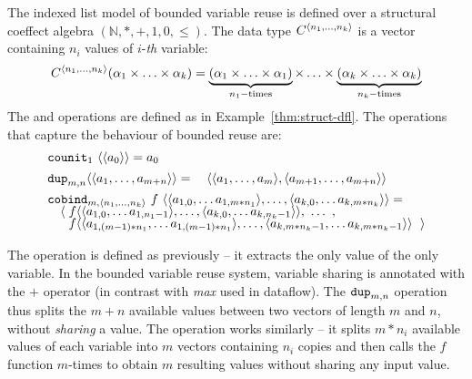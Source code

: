 \begin{example}
\label{thm:struct-bll}
The indexed list model of bounded variable reuse is defined over a structural coeffect
algebra $(\mathbb{N}, \ast, +, 1, 0, \leq)$. The data type $\ctyp{\langle n_1, \ldots, n_k\rangle}$
is a vector containing $n_i$ values of $i$-\textit{th} variable:
%
\begin{equation*}
C^{\langle n_1, \ldots, n_k\rangle}(\alpha_1 \times \ldots \times \alpha_k) =
\underbrace{(\alpha_1 \times \ldots \times \alpha_1)}_{n_1-\textnormal{times}} \times \ldots \times
  \underbrace{(\alpha_k \times \ldots \times \alpha_k)}_{n_k-\textnormal{times}}
\end{equation*}
%
The  and  operations are defined as in Example~\ref{thm:struct-dfl}.
The operations that capture the behaviour of bounded reuse are:
%
\begin{equation*}
\begin{array}{l}
\textnormal{\ttfamily counit}_{1}~\langle \langle a_0 \rangle \rangle = a_0
\\[0.45em]
\textnormal{\ttfamily dup}_{m, n} \langle \langle a_1, \ldots, a_{m+n} \rangle \rangle =
\quad \langle \langle a_1, \ldots, a_m \rangle, \langle a_{m+1}, \ldots, a_{m+n} \rangle \rangle
\\[0.45em]
\textnormal{\ttfamily cobind}_{m, \langle n_1, \ldots, n_k \rangle}~f~
  \langle \langle a_{1,0}, \ldots a_{1,m\ast{n_1}} \rangle, \ldots, \langle a_{k,0}, \ldots a_{k,m\ast{n_k}} \rangle \rangle = \\[-0.25em]
\quad \langle\; f \langle \langle a_{1,0}, \ldots a_{1,{n_1 - 1}} \rangle, \ldots, \langle a_{k,0}, \ldots a_{k,{n_k - 1}} \rangle \rangle, ~\ldots~, \\[-0.25em]
\quad ~~ f \langle \langle a_{1,(m-1)\ast n_1}, \ldots a_{1,(m-1) \ast n_1} \rangle, \ldots,
                   \langle a_{k,m\ast n_k - 1}, \ldots a_{k,m\ast n_k - 1} \rangle \rangle~\; \rangle
\end{array}
\end{equation*}
\end{example}

\noindent
The  operation is defined as previously -- it extracts the only value of the only
variable. In the bounded variable reuse system, variable sharing is annotated with the $+$ operator
(in contrast with \textit{max} used in dataflow). The $\textnormal{\ttfamily dup}_{m,n}$ operation thus splits the $m+n$
available values between two vectors of length $m$ and $n$, without \emph{sharing} a value. The
 operation works similarly -- it splits $m\ast n_i$ available values of each
variable into $m$ vectors containing $n_i$ copies and then calls the $f$ function $m$-times to
obtain $m$ resulting values without sharing any input value.

